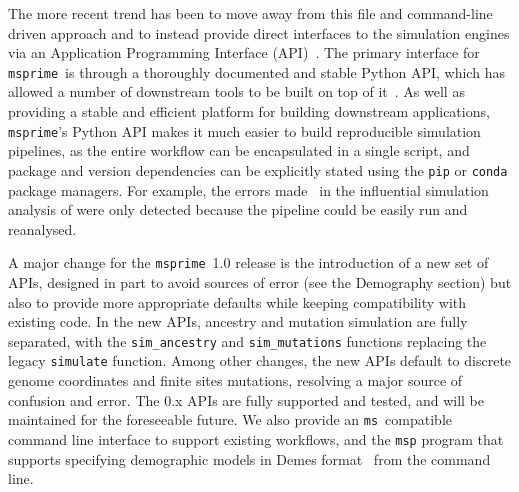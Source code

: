 \documentclass{article}
\newcommand{\msprime}[0]{\texttt{msprime}}
\newcommand{\ms}[0]{\texttt{ms}}
\begin{document}
The more recent trend has been to move away from this file and command-line
driven approach and to instead provide direct interfaces to the simulation
engines via an Application Programming Interface (API)~\citep[e.g.][]{
thornton2014cpp,kelleher2016efficient,becheler2019quetzal,haller2019slim}.
The primary interface for \msprime\ is through a thoroughly documented and
stable Python
API, which has allowed a number of downstream tools to be built on top of
it~\citep{terhorst2017robust,chan2018likelihood,spence2019inference,
adrion2020community,adrion2020predicting, kamm2020efficiently,
mckenzie2020ipcoal, montinaro2020revisiting,
de2021geonomics,rivera2021simulation}.
As well as providing a stable and efficient platform for building
downstream applications, \msprime's Python API makes it much easier to
build reproducible simulation pipelines, as the entire workflow can
be encapsulated in a single script, and package and version
dependencies can be explicitly stated using the \texttt{pip}
or \texttt{conda} package managers.
For example, the errors made~\citep{ragsdale2020lessons,martin2020erratum}
in the influential simulation analysis of
\cite{martin2017human} were only detected because the pipeline
could be easily run and reanalysed.

A major change for the \msprime\ 1.0 release is the introduction of a new set of APIs,
designed in part to avoid sources of error (see the Demography section) but
also to provide more appropriate defaults while keeping compatibility with
existing code. In the new APIs, ancestry and mutation simulation are fully
separated, with the \texttt{sim\_ancestry} and \texttt{sim\_mutations}
functions replacing the legacy \texttt{simulate} function. Among other changes,
the new APIs default to discrete genome coordinates and finite sites mutations,
resolving a major source of confusion and error. The 0.x APIs are fully
supported and tested, and will be maintained for the foreseeable future.
We also provide an \ms\ compatible
command line interface to support existing workflows, and the
\texttt{msp} program that supports specifying demographic models in
Demes format~\citep{gower2021demes} from the command line.
\end{document}
